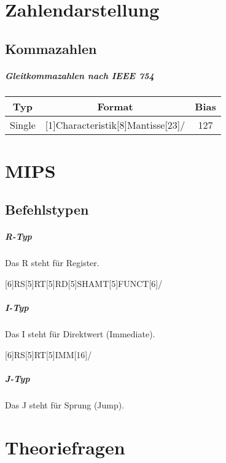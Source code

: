 \chapter{Zahlendarstellung}
	\section{Kommazahlen}
		\paragraph{Gleitkommazahlen nach IEEE 754}
			\begin{tabular}{c | c | c}
				Typ    & Format                                                             & Bias \\
				\hline
				Single & \bitpattern[startBit = 31]{V}[1]{Characteristik}[8]{Mantisse}[23]/ & 127  \\
			\end{tabular}

\chapter{MIPS}
	\section{Befehlstypen}
		\paragraph{R-Typ}
			Das R steht für Register.

			[6]{RS}[5]{RT}[5]{RD}[5]{SHAMT}[5]{FUNCT}[6]/

		\paragraph{I-Typ}
			Das I steht für Direktwert (Immediate).

			[6]{RS}[5]{RT}[5]{IMM}[16]/

		\paragraph{J-Typ}
			Das J steht für Sprung (Jump).

\chapter{Theoriefragen}
